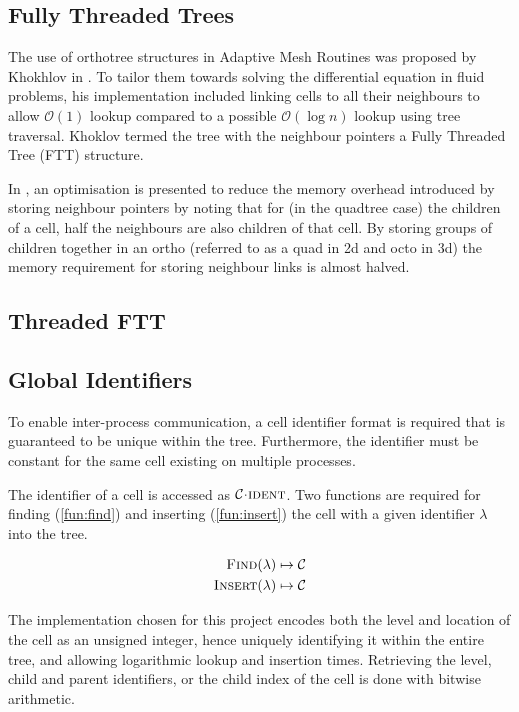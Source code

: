 \documentclass{IIBproject}
\newcommand{\acc}{{\mkern 0.5mu\cdot\mkern 0.5mu}}
\begin{document}
\subsection{Fully Threaded Trees}

The use of orthotree structures in Adaptive Mesh Routines was proposed by Khokhlov in \cite{Khokhlov98}. To tailor them towards solving the differential equation in fluid problems, his implementation included linking cells to all their neighbours to allow $\mathcal{O}(1)$ lookup compared to a possible $\mathcal{O}(\log n)$ lookup using tree traversal. Khoklov termed the tree with the neighbour pointers a Fully Threaded Tree (FTT) structure. 

In \cite{Khokhlov98}, an optimisation is presented to reduce the memory overhead introduced by storing neighbour pointers by noting that for (in the quadtree case) the children of a cell, half the neighbours are also children of that cell. By storing groups of children together in an ortho (referred to as a quad in 2d and octo in 3d) the memory requirement for storing neighbour links is almost halved.



\subsection{Threaded FTT}


\subsection{Global Identifiers}

To enable inter-process communication, a cell identifier format is required that is guaranteed to be unique within the tree. Furthermore, the identifier must be constant for the same cell existing on multiple processes. 

The identifier of a cell is accessed as $\mathcal{C}\acc\textproc{ident}$. Two functions are required for finding (\ref{fun:find}) and inserting (\ref{fun:insert}) the cell with a given identifier $\lambda$ into the tree.

\begin{align}
	\label{fun:find}
	\textproc{Find}(\lambda) \mapsto \mathcal{C} \\
	\label{fun:insert}
	\textproc{Insert}(\lambda) \mapsto \mathcal{C}
\end{align}

The implementation chosen for this project encodes both the level and location of the cell as an unsigned integer, hence uniquely identifying it within the entire tree, and allowing logarithmic lookup and insertion times. Retrieving the level, child and parent identifiers, or the child index of the cell is done with bitwise arithmetic. 
\end{document}
